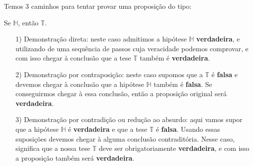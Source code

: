 \documentclass{beamer}
\begin{document}
    \begin{frame}
        Temos 3 caminhos para tentar provar uma proposição do tipo:
        \begin{center}
            Se $\mathbb{H}$, então $\mathbb{T}$.\pause
        \end{center}

        \begin{itemize}
            \item[1)] Demonstração direta: \pause neste caso admitimos a hipótese $\mathbb{H}$ \textbf{verdadeira}, e utilizando de uma
                sequência de passos cuja veracidade podemos comprovar, e com isso chegar à conclusão que a tese $\mathbb{T}$ também é
                \textbf{verdadeira}.\pause
            \item[2)] Demonstração por contraposição: \pause neste caso supomos que a $\mathbb{T}$ é \textbf{falsa} e devemos
                chegar à conclusão que a hipótese $\mathbb{H}$ também é \textbf{falsa}. Se conseguirmos chegar à essa
                conclusão, então a proposição original será \textbf{verdadeira}.\pause
            \item[3)] Demonstração por contradição ou redução ao absurdo: \pause aqui vamos supor que a hipótese
                $\mathbb{H}$ é \textbf{verdadeira} \pause e que a tese $\mathbb{T}$ é \textbf{falsa}. Usando essas suposições
                devemos chegar à alguma conclusão contraditória. \pause Nesse caso, significa que a nossa tese $\mathbb{T}$ deve ser
                obrigatoriamente \textbf{verdadeira}, e com isso a proposição também será \textbf{verdadeira}.\pause
        \end{itemize}
    \end{frame}
\end{document}
